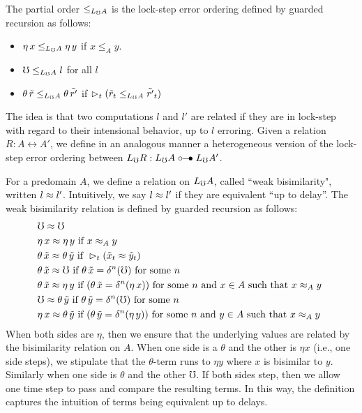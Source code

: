 The partial order $\le_{L_\mho A}$ is the lock-step error ordering defined by guarded recursion as follows:
%
\begin{itemize}
    \item 	$\eta\, x \le_{L_\mho A} \eta\, y$ if $x \le_A y$.
    \item 	$\mho \le_{L_\mho A} l$ for all $l$ 
    \item   $\theta\, \tilde{r} \le_{L_\mho A} \theta\, \tilde{r'}$ if
            $\vartriangleright_t (\tilde{r}_t \le_{L_\mho A} \tilde{r'}_t)$
  \end{itemize}
%
The idea is that two computations $l$ and $l'$ are related if they are in
lock-step with regard to their intensional behavior, up to $l$ erroring.
Given a relation $R : A \rel A'$, we define in an analogous manner a heterogeneous
version of the lock-step error ordering between $L_\mho R : L_\mho A \mathrel{\circ\mkern-6mu-\mkern-6mu\bullet} L_\mho A'$.


%
For a predomain $A$, we define a relation on $L_\mho A$, called ``weak bisimilarity",
written $l \approx l'$. Intuitively, we say $l \approx l'$ if they are equivalent ``up to delay''.
The weak bisimilarity relation is defined by guarded recursion as follows:
%
\begin{align*}
  &\mho \bisim \mho \\
%
  &\eta\, x \bisim \eta\, y \text{ if } 
    x \bisim_A y \\
%		
  &\theta\, \tilde{x} \bisim \theta\, \tilde{y} \text{ if } 
    \later_t (\tilde{x}_t \bisim \tilde{y}_t) \\
%	
  &\theta\, \tilde{x} \bisim \mho \text{ if } 
    \theta\, \tilde{x} = \delta^n(\mho) \text { for some $n$ } \\
%	
  &\theta\, \tilde{x} \bisim \eta\, y \text{ if }
    (\theta\, \tilde{x} = \delta^n(\eta\, x))
  \text { for some $n$ and $x \in A$ such that $x \bisim_A y$ } \\
%
  &\mho \bisim \theta\, \tilde{y} \text { if } 
    \theta\, \tilde{y} = \delta^n(\mho) \text { for some $n$ } \\
%	
  &\eta\, x \bisim \theta\, \tilde{y} \text { if }
    (\theta\, \tilde{y} = \delta^n (\eta\, y))
  \text { for some $n$ and $y \in A$ such that $x \bisim_A y$ }
\end{align*}
%
When both sides are $\eta$, then we ensure that the underlying values are related
by the bisimilarity relation on $A$.
When one side is a $\theta$ and the other is $\eta x$ (i.e., one side steps),
we stipulate that the $\theta$-term runs to $\eta y$ where $x$ is bisimilar to $y$.
Similarly when one side is $\theta$ and the other $\mho$.
If both sides step, then we allow one time step to pass and compare the resulting terms.
In this way, the definition captures the intuition of terms being equivalent up to
delays.

